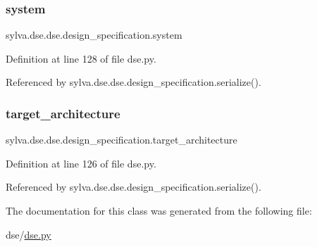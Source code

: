 \subsubsection{\texorpdfstring{system}{system}}
{\footnotesize\ttfamily sylva.\+dse.\+dse.\+design\+\_\+specification.\+system}



Definition at line 128 of file dse.\+py.



Referenced by sylva.\+dse.\+dse.\+design\+\_\+specification.\+serialize().

\mbox{\label{classsylva_1_1dse_1_1dse_1_1design__specification_abbf25f6a1f9aaa73f5e29885b8bdd8a6}} 
\subsubsection{\texorpdfstring{target\+\_\+architecture}{target\_architecture}}
{\footnotesize\ttfamily sylva.\+dse.\+dse.\+design\+\_\+specification.\+target\+\_\+architecture}



Definition at line 126 of file dse.\+py.



Referenced by sylva.\+dse.\+dse.\+design\+\_\+specification.\+serialize().



The documentation for this class was generated from the following file\+:\begin{DoxyCompactItemize}
\item 
dse/\hyperlink{dse_8py}{dse.\+py}\end{DoxyCompactItemize}
